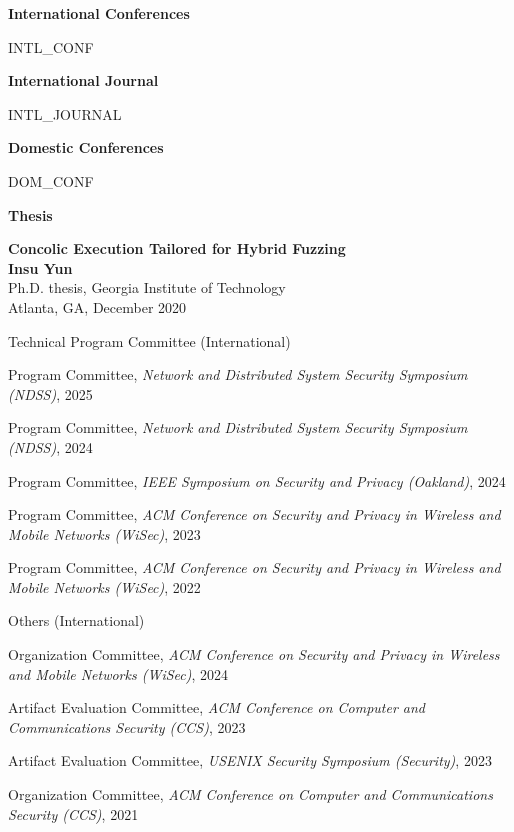 \documentclass[11pt,letterpaper]{article}
\begin{document}
%
%


\textbf{International Conferences }
\begin{etaremune}
  {{ INTL_CONF }}
\end{etaremune}

\textbf{International Journal}
\begin{etaremune}
  {{ INTL_JOURNAL }}
\end{etaremune}

\textbf{Domestic Conferences}
\begin{etaremune}
  {{ DOM_CONF }}
\end{etaremune}

\textbf{Thesis}
\begin{etaremune}
\item \textbf{Concolic Execution Tailored for Hybrid Fuzzing}  \\
{\footnotesize
  \textbf{Insu Yun} \\
  Ph.D. thesis, Georgia Institute of Technology \\
Atlanta, GA, December 2020
}
\end{etaremune}

\begin{topic}{Technical Program Committee (International)}{}
  \item{Program Committee, \emph{Network and Distributed System Security Symposium (NDSS)}, 2025} %
  \item{Program Committee, \emph{Network and Distributed System Security Symposium (NDSS)}, 2024} %
  \item{Program Committee, \emph{IEEE Symposium on Security and Privacy (Oakland)}, 2024} %
  \item{Program Committee, \emph{ACM Conference on Security and Privacy in Wireless and Mobile Networks (WiSec)}, 2023} %
  \item{Program Committee, \emph{ACM Conference on Security and Privacy in Wireless and Mobile Networks (WiSec)}, 2022} %
\end{topic}

\begin{topic}{Others (International)}{}
  \item{Organization Committee, \emph{ACM Conference on Security and Privacy in Wireless and Mobile Networks (WiSec)}, 2024} %
  \item{Artifact Evaluation Committee, \emph{ACM Conference on Computer and Communications Security (CCS)}, 2023} %
  \item{Artifact Evaluation Committee, \emph{USENIX Security Symposium (Security)}, 2023} %
  \item{Organization Committee, \emph{ACM Conference on Computer and Communications Security (CCS)}, 2021} %
\end{topic}
\end{document}
